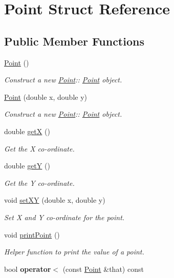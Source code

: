 \hypertarget{classPoint}{}\section{Point Struct Reference}
\label{classPoint}
\subsection*{Public Member Functions}
\begin{DoxyCompactItemize}
\item 
\mbox{\label{classPoint_ad92f2337b839a94ce97dcdb439b4325a}} 
\hyperlink{classPoint_ad92f2337b839a94ce97dcdb439b4325a}{Point} ()
\begin{DoxyCompactList}\small\item\em Construct a new \hyperlink{classPoint}{Point}\+:\+: \hyperlink{classPoint}{Point} object. \end{DoxyCompactList}\item 
\hyperlink{classPoint_a78b55e8d5466bb8c2cf60fa55f2562ff}{Point} (double x, double y)
\begin{DoxyCompactList}\small\item\em Construct a new \hyperlink{classPoint}{Point}\+:\+: \hyperlink{classPoint}{Point} object. \end{DoxyCompactList}\item 
double \hyperlink{classPoint_a8de35a6098cdd7267b4167776da83da6}{getX} ()
\begin{DoxyCompactList}\small\item\em Get the X co-\/ordinate. \end{DoxyCompactList}\item 
double \hyperlink{classPoint_aa278c8bcb8aeb4101023a4baf473b547}{getY} ()
\begin{DoxyCompactList}\small\item\em Get the Y co-\/ordinate. \end{DoxyCompactList}\item 
void \hyperlink{classPoint_ad62d5a34b47be46beab076e61628e470}{set\+XY} (double x, double y)
\begin{DoxyCompactList}\small\item\em Set X and Y co-\/ordinate for the point. \end{DoxyCompactList}\item 
\mbox{\label{classPoint_ad32f6a515be1cf069bf5ea6b89178ae9}} 
void \hyperlink{classPoint_ad32f6a515be1cf069bf5ea6b89178ae9}{print\+Point} ()
\begin{DoxyCompactList}\small\item\em Helper function to print the value of a point. \end{DoxyCompactList}\item 
\mbox{\label{classPoint_a070986db7e29447722479f839c14216f}} 
bool {\bfseries operator$<$} (const \hyperlink{classPoint}{Point} \&that) const
\end{DoxyCompactItemize}
